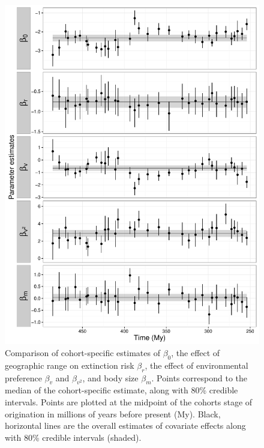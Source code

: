 \documentclass{article}
\begin{document}
\begin{figure}[ht]
  \centering
  \includegraphics[width = \textwidth,height = 0.8\textheight,keepaspectratio=true]{figure/cohort_series}
  \caption{Comparison of cohort-specific estimates of \(\beta_{0}\), the effect of geographic range on extinction risk \(\beta_{r}\), the effect of environmental preference \(\beta_{v}\) and \(\beta_{v^{2}}\), and body size \(\beta_{m}\). Points correspond to the median of the cohort-specific estimate, along with 80\% credible intervals. Points are plotted at the midpoint of the cohorts stage of origination in millions of years before present (My). Black, horizontal lines are the overall estimates of covariate effects along with 80\% credible intervals (shaded).}
  \label{fig:cohort_series}
\end{figure}
\end{document}
